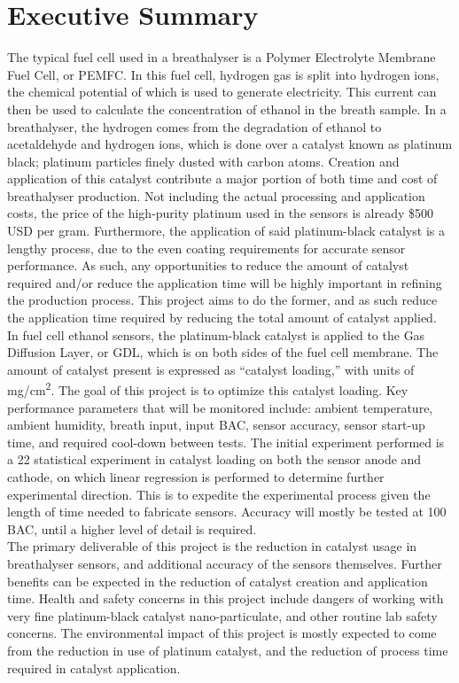\documentclass{article}
\begin{document}
	\section{Executive Summary}
	The typical fuel cell used in a breathalyser is a Polymer Electrolyte Membrane Fuel Cell, or PEMFC. In this fuel cell, hydrogen gas is split into hydrogen ions, the chemical potential of which is used to generate electricity. This current can then be used to calculate the concentration of ethanol in the breath sample. In a breathalyser, the hydrogen comes from the degradation of ethanol to acetaldehyde and hydrogen ions, which is done over a catalyst known as platinum black; platinum particles finely dusted with carbon atoms. Creation and application of this catalyst contribute a major portion of both time and cost of breathalyser production.
Not including the actual processing and application costs, the price of the high-purity platinum used in the sensors is already \$500 USD per gram. Furthermore, the application of said platinum-black catalyst is a lengthy process, due to the even coating requirements for accurate sensor performance.  As such, any opportunities to reduce the amount of catalyst required and/or reduce the application time will be highly important in refining the production process. This project aims to do the former, and as such reduce the application time required by reducing the total amount of catalyst applied.\\
	In fuel cell ethanol sensors, the platinum-black catalyst is applied to the Gas Diffusion Layer, or GDL, which is on both sides of the fuel cell membrane. The amount of catalyst present is expressed as “catalyst loading,” with units of mg/cm\textsuperscript{2}. The goal of this project is to optimize this catalyst loading. Key performance parameters that will be monitored include: ambient temperature, ambient humidity, breath input, input BAC, sensor accuracy, sensor start-up time, and required cool-down between tests. The initial experiment performed is a 22 statistical experiment in catalyst loading on both the sensor anode and cathode, on which linear regression is performed to determine further experimental direction. This is to expedite the experimental process given the length of time needed to fabricate sensors. Accuracy will mostly be tested at 100 BAC, until a higher level of detail is required. \\
	The primary deliverable of this project is the reduction in catalyst usage in breathalyser sensors, and additional accuracy of the sensors themselves. Further benefits can be expected in the reduction of catalyst creation and application time. Health and safety concerns in this project include dangers of working with very fine platinum-black catalyst nano-particulate, and other routine lab safety concerns. The environmental impact of this project is mostly expected to come from the reduction in use of platinum catalyst, and the reduction of process time required in catalyst application.
\pagebreak
\end{document}
